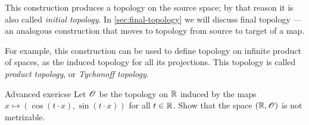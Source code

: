 This construction produces a topology on the source space;
by that reason it is also called \emph{initial topology}.
In \ref{sec:final-topology} we will discuss final topology --- an analogous construction that moves to topology from source to target of a map.

For example, this construction can be used to define topology on infinite product of spaces, as the induced topology for all its projections.
This topology is called \emph{product topology}, or \emph{Tychonoff topology}.

\begin{thm}{Advanced exericse}\label{ex:induced-nonmetrizable}
Let $\mathscr{O}$ be the topology on $\mathbb{R}$ induced by the maps $x\mapsto (\cos(t\cdot x),\sin(t\cdot x))$ for all $t\in \mathbb{R}$.
Show that the space $(\mathbb{R},\mathscr{O})$ is not metrizable.
\end{thm}


